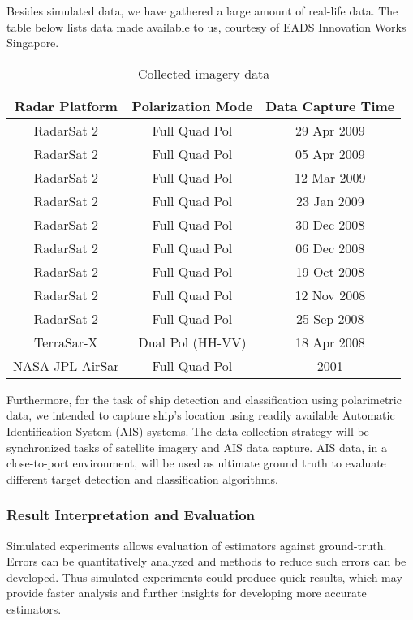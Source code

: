 Besides simulated  data, we have gathered a large amount of real-life data.
The table below lists data made available to us, courtesy of EADS Innovation Works Singapore. %

\begin{table}
\centering
\begin{tabular}{|c|c|c|}
\hline
Radar Platform & Polarization Mode & Data Capture Time \\
\hline
RadarSat 2 & Full Quad Pol & 29 Apr 2009 \\
RadarSat 2 & Full Quad Pol & 05 Apr 2009 \\
RadarSat 2 & Full Quad Pol & 12 Mar 2009 \\
RadarSat 2 & Full Quad Pol & 23 Jan 2009 \\
RadarSat 2 & Full Quad Pol & 30 Dec 2008 \\
RadarSat 2 & Full Quad Pol & 06 Dec 2008 \\
RadarSat 2 & Full Quad Pol & 19 Oct 2008 \\
RadarSat 2 & Full Quad Pol & 12 Nov 2008 \\
RadarSat 2 & Full Quad Pol & 25 Sep 2008 \\
TerraSar-X & Dual Pol (HH-VV) & 18 Apr 2008 \\
NASA-JPL AirSar & Full Quad Pol & 2001 \\
\hline
\end{tabular}

\label{tbl:collected_data}
\caption{Collected imagery data}
\end{table}

Furthermore, for the task of ship detection and classification using polarimetric data, we intended to capture ship's location using readily available Automatic Identification System (AIS) systems. 
The data collection strategy will be synchronized tasks of satellite imagery and AIS data capture.
AIS data, in a close-to-port environment, will be used as ultimate ground truth to evaluate different target detection and classification algorithms.

\subsubsection{Result Interpretation and Evaluation}

Simulated experiments allows evaluation of estimators against ground-truth.
Errors can be quantitatively analyzed and methods to reduce such errors can be developed.
Thus simulated experiments could produce quick results, which may provide faster analysis and further insights for developing more accurate estimators.

